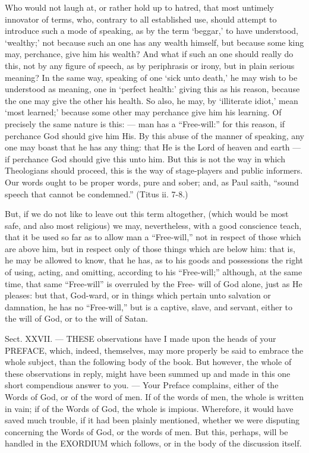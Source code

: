 Who would not laugh at, or rather hold up to hatred, that most untimely innovator of terms, who, contrary to all established use, should attempt to introduce such a mode of speaking, as by the term ‘beggar,’ to have understood, ‘wealthy;’ not because such an one has any wealth himself, but because some king may, perchance, give him his wealth? And what if such an one should really do this, not by any figure of speech, as by periphrasis or irony, but in plain serious meaning? In the same way, speaking of one ‘sick unto death,’ he may wish to be understood as meaning, one in ‘perfect health:’ giving this as his reason, because the one may give the other his health. So also, he may, by ‘illiterate idiot,’ mean ‘most learned;’ because some other may perchance give him his learning. Of precisely the same nature is this: — man has a “Free-will:” for this reason, if perchance God should give him His. By this abuse of the manner of speaking, any one may boast that he has any thing: that He is the Lord of heaven and earth — if perchance God should give this unto him. But this is not the way in which Theologians should proceed, this is the way of stage-players and public informers. Our words ought to be proper words, pure and sober; and, as Paul saith, “sound speech that cannot be condemned.” (Titus ii. 7-8.)

But, if we do not like to leave out this term altogether, (which would be most safe, and also most religious) we may, nevertheless, with a good conscience teach, that it be used so far as to allow man a “Free-will,” not in respect of those which are above him, but in respect only of those things which are below him: that is, he may be allowed to know, that he has, as to his goods and possessions the right of using, acting, and omitting, according to his “Free-will;” although, at the same time, that same “Free-will” is overruled by the Free- will of God alone, just as He pleases: but that, God-ward, or in things which pertain unto salvation or damnation, he has no “Free-will,” but is a captive, slave, and servant, either to the will of God, or to the will of Satan.


Sect. XXVII. — THESE observations have I made upon the heads of your \textsc{PREFACE}, which, indeed, themselves, may more properly be said to embrace the whole subject, than the following body of the book. But however, the whole of these observations in reply, might have been summed up and made in this one short compendious answer to you. — Your Preface complains, either of the Words of God, or of the word of men. If of the words of men, the whole is written in vain; if of the Words of God, the whole is impious. Wherefore, it would have saved much trouble, if it had been plainly mentioned, whether we were disputing concerning the Words of God, or the words of men. But this, perhaps, will be handled in the \textsc{EXORDIUM} which follows, or in the body of the discussion itself.


